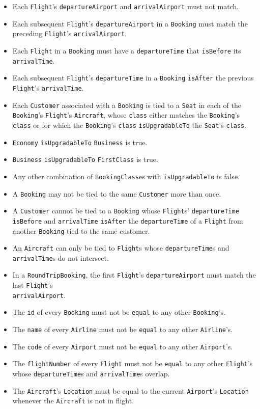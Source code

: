 \documentclass[12pt,a4paper,titlepage]{article}
\def\code#1{\texttt{#1}}
\begin{document}
\begin{itemize}
\item Each \code{Flight}'s \code{departureAirport} and \code{arrivalAirport} must not match.
\item Each subsequent \code{Flight}'s \code{departureAirport} in a \code{Booking} must match the preceding \code{Flight}'s \code{arrivalAirport}.
\item Each \code{Flight} in a \code{Booking} must have a \code{departureTime} that \code{isBefore} its \code{arrivalTime}.
\item Each subsequent \code{Flight}'s \code{departureTime} in a \code{Booking} \code{isAfter} the previous \code{Flight}'s \code{arrivalTime}.
\item Each \code{Customer} associated with a \code{Booking} is tied to a \code{Seat} in each of the \code{Booking}'s \code{Flight}'s \code{Aircraft}, whose \code{class} either matches the \code{Booking}'s \code{class} or for which the \code{Booking}'s \code{class} \code{isUpgradableTo} the \code{Seat}'s \code{class}.
\item \code{Economy} \code{isUpgradableTo} \code{Business} is true.
\item \code{Business} \code{isUpgradableTo} \code{FirstClass} is true.
\item Any other combination of \code{BookingClass}es with \code{isUpgradableTo} is false.
\item A \code{Booking} may not be tied to the same \code{Customer} more than once.
\item A \code{Customer} cannot be tied to a \code{Booking} whose \code{Flight}s' \code{departureTime} \code{isBefore} and \code{arrivalTime} \code{isAfter} the \code{departureTime} of a \code{Flight} from another \code{Booking} tied to the same customer.
\item An \code{Aircraft} can only be tied to \code{Flight}s whose \code{departureTime}s and \code{arrivalTime}s do not intersect.
\item In a \code{RoundTripBooking}, the first \code{Flight}'s \code{departureAirport} must match the last \code{Flight}'s \\\code{arrivalAirport}.
\item The \code{id} of every \code{Booking} must not be \code{equal} to any other \code{Booking}'s.
\item The \code{name} of every \code{Airline} must not be \code{equal} to any other \code{Airline}'s.
\item The \code{code} of every \code{Airport} must not be \code{equal} to any other \code{Airport}'s.
\item The \code{flightNumber} of every \code{Flight} must not be \code{equal} to any other \code{Flight}'s whose \code{departureTime}s and \code{arrivalTime}s overlap.
\item The \code{Aircraft}'s \code{Location} must be equal to the current \code{Airport}'s \code{Location} whenever the \code{Aircraft} is not in flight.
\end{itemize}
\end{document}
